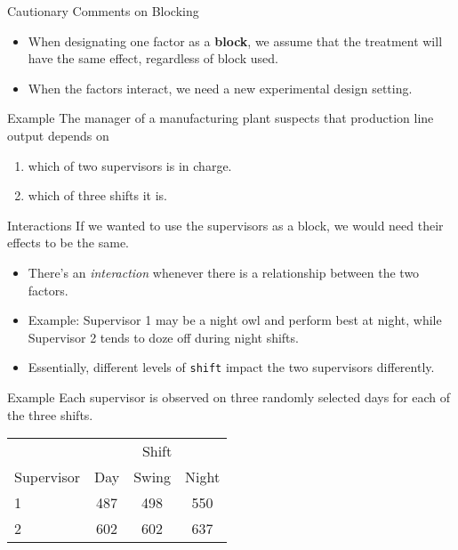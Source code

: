 \begin{frame}{Cautionary Comments on Blocking}
    \begin{itemize}
        \item When designating one factor as a \textbf{block}, we assume that the treatment will have the same effect, regardless of block used. 
        \item When the factors interact, we need a new experimental design setting.
    \end{itemize}
\end{frame}

\begin{frame}{Example}
    The manager of a manufacturing plant suspects that production line output depends on 
    \begin{enumerate}
        \item which of two supervisors is in charge.
        \item which of three shifts it is.
    \end{enumerate}
\end{frame}

\begin{frame}{Interactions}
    If we wanted to use the supervisors as a block, we would need their effects to be the same. 
    \begin{itemize}
        \item <1-> There's an \textit{interaction} whenever there is a relationship between the two factors.
        \item <2-> Example: Supervisor 1 may be a night owl and perform best at night, while Supervisor 2 tends to doze off during night shifts. 
        \item <3-> Essentially, different levels of \texttt{shift} impact the two supervisors differently.
    \end{itemize}
\end{frame}

\begin{frame}{Example}
    Each supervisor is observed on three randomly selected days for each of the three shifts. 
    \begin{table}[h]
        \centering
        \begin{tabular}{lccc}
             & \multicolumn{3}{c}{Shift} \\
            \cline{2-4}
            Supervisor & Day & Swing & Night \\
            \hline
            1 & 487 & 498 & 550 \\
            2 & 602 & 602 & 637 \\
            \hline
        \end{tabular}
    \end{table}
\end{frame}

